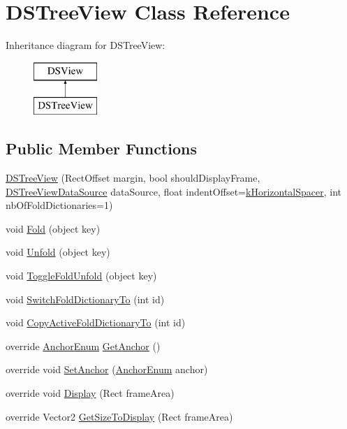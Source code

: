 \hypertarget{class_d_s_tree_view}{\section{D\+S\+Tree\+View Class Reference}
\label{class_d_s_tree_view}
}
Inheritance diagram for D\+S\+Tree\+View\+:\begin{figure}[H]
\begin{center}
\leavevmode
\includegraphics[height=2.000000cm]{class_d_s_tree_view}
\end{center}
\end{figure}
\subsection*{Public Member Functions}
\begin{DoxyCompactItemize}
\item 
\hyperlink{class_d_s_tree_view_a32cffeb0732be7bc7c756a6ca2f1d714}{D\+S\+Tree\+View} (Rect\+Offset margin, bool should\+Display\+Frame, \hyperlink{interface_d_s_tree_view_data_source}{D\+S\+Tree\+View\+Data\+Source} data\+Source, float indent\+Offset=\hyperlink{class_d_s_view_a54308b2e24c6fd769eb1045a72209189}{k\+Horizontal\+Spacer}, int nb\+Of\+Fold\+Dictionaries=1)
\item 
void \hyperlink{class_d_s_tree_view_a587746c122e79e5d1de051a0fcd1f6e6}{Fold} (object key)
\item 
void \hyperlink{class_d_s_tree_view_ab41641d050f97bb2c7e167741a778991}{Unfold} (object key)
\item 
void \hyperlink{class_d_s_tree_view_a015192e710c45a6e0e863e60006eb87b}{Toggle\+Fold\+Unfold} (object key)
\item 
void \hyperlink{class_d_s_tree_view_a327fe891b78c289f5c9b9d7a5713dbaa}{Switch\+Fold\+Dictionary\+To} (int id)
\item 
void \hyperlink{class_d_s_tree_view_a85e7c8ce58ad5d0784a056ea589e83f7}{Copy\+Active\+Fold\+Dictionary\+To} (int id)
\item 
override \hyperlink{class_d_s_view_a8b41b9ec1b18bd33872a37cbd3a2dbe1}{Anchor\+Enum} \hyperlink{class_d_s_tree_view_a7c9b7ee4c56aa7677d4eb01a90bab625}{Get\+Anchor} ()
\item 
override void \hyperlink{class_d_s_tree_view_ad963866c3842d73aac5c253e3b65c349}{Set\+Anchor} (\hyperlink{class_d_s_view_a8b41b9ec1b18bd33872a37cbd3a2dbe1}{Anchor\+Enum} anchor)
\item 
override void \hyperlink{class_d_s_tree_view_a2efa427e37b7c4e91f2d126c19aefd19}{Display} (Rect frame\+Area)
\item 
override Vector2 \hyperlink{class_d_s_tree_view_a046a7b85326a951e6483f86a18568352}{Get\+Size\+To\+Display} (Rect frame\+Area)
\end{DoxyCompactItemize}

